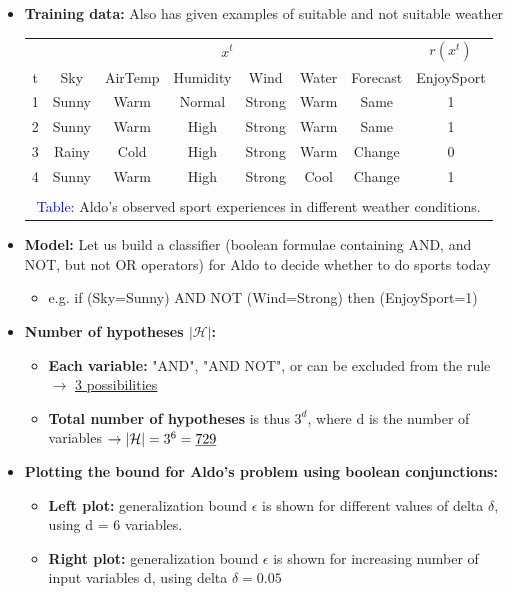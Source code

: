 \documentclass[12pt, a4paper]{article}
\begin{document}
\begin{itemize}
  \item \textbf{Training data:} Also has given examples of suitable and not suitable weather

  \begin{center}
    \begin{tabular}{ |c|c c c c c c|c| }
     \hline
      & \multicolumn{6}{|c|}{$x^t$} & $r(x^t)$ \\
       t & Sky & AirTemp & Humidity & Wind & Water & Forecast & EnjoySport \\
       \hline
       1 & Sunny & Warm & Normal & Strong & Warm & Same & 1 \\
       2 & Sunny & Warm & High & Strong & Warm & Same & 1 \\
       3 & Rainy & Cold & High & Strong & Warm & Change & 0 \\
       4 & Sunny & Warm & High & Strong & Cool & Change & 1 \\
       \multicolumn{8}{|c|}{} \\
       \multicolumn{8}{|c|}{\textcolor{blue}{Table:} Aldo's observed sport experiences in different weather conditions.} \\
     \hline
    \end{tabular}
  \end{center}

  \item \textbf{Model:} Let us build a classifier (boolean formulae containing AND, and NOT, but not OR operators) for Aldo to decide whether to do sports today
  \begin{itemize}
    \item e.g. if (Sky=Sunny) AND NOT (Wind=Strong) then (EnjoySport=1)
  \end{itemize}

  \item \textbf{Number of hypotheses $|\mathcal{H}|$:}
  \begin{itemize}
    \item \textbf{Each variable:} "AND", "AND NOT", or can be excluded from the rule $\rightarrow$ \uline{3 possibilities}
    \item \textbf{Total number of hypotheses} is thus $3^d$, where d is the number of variables $\rightarrow |\mathcal{H}| = 3^6 = \uline{729}$
  \end{itemize}

  \item \textbf{Plotting the bound for Aldo’s problem using boolean conjunctions:}
  \begin{itemize}
    \item \textbf{Left plot:} generalization bound $\epsilon$ is shown for different values of delta $\delta$, using d = 6 variables.
    \item \textbf{Right plot:} generalization bound $\epsilon$ is shown for increasing number of input variables d, using delta $\delta = 0.05$


\end{itemize}
\end{itemize}
\end{document}
